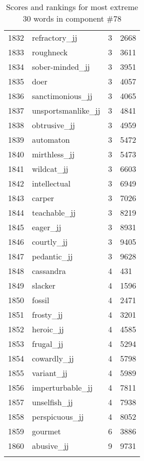 \begin{longtable}[!htbp]{| rlr@{.}l |}
    1832 & refractory\_jj & 3 & 2668 \\
    1833 & roughneck & 3 & 3611 \\
    1834 & sober-minded\_jj & 3 & 3951 \\
    1835 & doer & 3 & 4057 \\
    1836 & sanctimonious\_jj & 3 & 4065 \\
    1837 & unsportsmanlike\_jj & 3 & 4841 \\
    1838 & obtrusive\_jj & 3 & 4959 \\
    1839 & automaton & 3 & 5472 \\
    1840 & mirthless\_jj & 3 & 5473 \\
    1841 & wildcat\_jj & 3 & 6603 \\
    1842 & intellectual & 3 & 6949 \\
    1843 & carper & 3 & 7026 \\
    1844 & teachable\_jj & 3 & 8219 \\
    1845 & eager\_jj & 3 & 8931 \\
    1846 & courtly\_jj & 3 & 9405 \\
    1847 & pedantic\_jj & 3 & 9628 \\
    1848 & cassandra & 4 & 431 \\
    1849 & slacker & 4 & 1596 \\
    1850 & fossil & 4 & 2471 \\
    1851 & frosty\_jj & 4 & 3201 \\
    1852 & heroic\_jj & 4 & 4585 \\
    1853 & frugal\_jj & 4 & 5294 \\
    1854 & cowardly\_jj & 4 & 5798 \\
    1855 & variant\_jj & 4 & 5989 \\
    1856 & imperturbable\_jj & 4 & 7811 \\
    1857 & unselfish\_jj & 4 & 7938 \\
    1858 & perspicuous\_jj & 4 & 8052 \\
    1859 & gourmet & 6 & 3886 \\
    1860 & abusive\_jj & 9 & 9731 \\
    \hline
    \caption{Scores and rankings for most extreme 30 words in component \#78} \\
\end{longtable}
